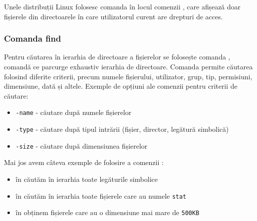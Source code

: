 Unele distribuții Linux folosesc comanda  în locul comenzii , care afișează doar fișierele din directoarele în care utilizatorul curent are drepturi de acces.

\subsubsection{Comanda find}
\label{sec:fs:find}

Pentru căutarea în ierarhia de directoare a fișierelor se folosește comanda , comandă ce parcurge exhaustiv ierarhia de directoare.
Comanda permite căutarea folosind diferite criterii, precum numele fișierului, utilizator, grup, tip, permisiuni, dimensiune, dată și altele.
Exemple de opțiuni ale comenzii  pentru criterii de căutare:

\begin{itemize}
  \item \texttt{-name} - căutare după numele fișierelor
  \item \texttt{-type} - căutare după tipul intrării (fișier, director, legătură simbolică)
  \item \texttt{-size} - căutare după dimensiunea fișierelor
\end{itemize}

Mai jos avem câteva exemple de folosire a comenzii :

\begin{itemize}
  \item în  căutăm în ierarhia  toate legăturile simbolice
  \item în  căutăm în ierarhia  toate fișierele care au numele \texttt{stat}
  \item în  obținem fișierele care au o dimensiune mai mare de \texttt{500KB}
\end{itemize}


